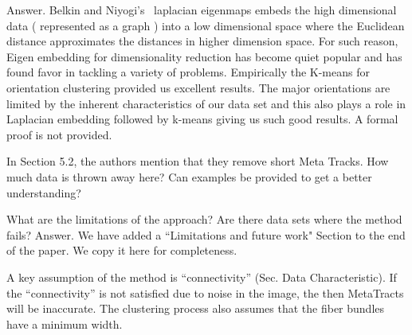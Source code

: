 \documentclass[]{article}
\begin{document}
\color{black}
Answer. Belkin  and Niyogi's~\cite{Belkin01} laplacian eigenmaps embeds the high dimensional data ( represented as a graph ) into a low dimensional space where the Euclidean distance approximates the distances in higher dimension space. For such reason, Eigen embedding for dimensionality reduction has become quiet popular and has found favor in tackling a variety of problems. Empirically the K-means for orientation clustering provided us excellent results. The major orientations are limited by the inherent characteristics of our data set and this also plays a role in Laplacian embedding followed by k-means giving us such good results. A formal proof is not provided. 

\color{red}
In Section 5.2, the authors mention that they remove short Meta Tracks.
How much data is thrown away here? Can examples be provided to get a
better understanding?
\color{black}


\color{red}

What are the limitations of the approach? Are there data sets where the
method fails?
\color{black}
Answer. We have added a ``Limitations and future work" Section to the end of the paper. We copy it here for completeness.


 A key assumption of the method is ``connectivity'' (Sec. Data Characteristic).
 If the ``connectivity'' is not satisfied due to noise in the image, the then MetaTracts will be inaccurate. 
 The clustering process also assumes that the fiber bundles have a minimum width. 


\end{document}
